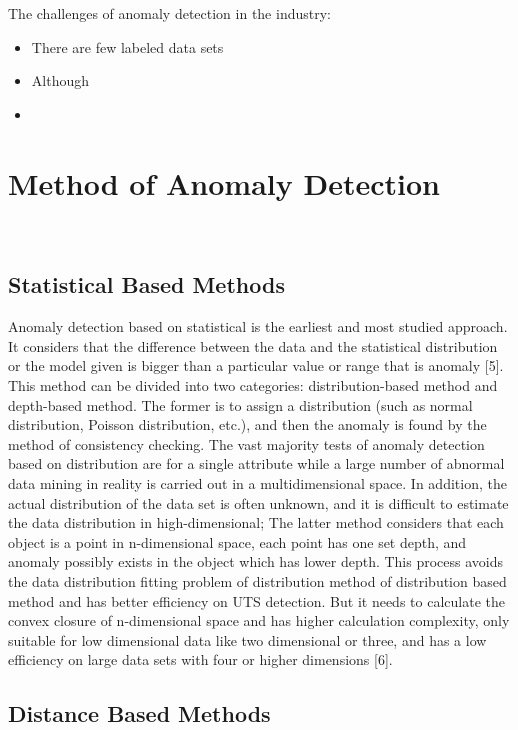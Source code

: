 The challenges of anomaly detection in the industry:
\begin{itemize}
    \item There are few labeled data sets 
    \item Although 
    \item 
\end{itemize}

\section{Method of Anomaly Detection}~\label{sec-method}
\subsection{Statistical Based Methods}
Anomaly detection based on statistical is the earliest and
most studied approach.
It considers that the difference
between the data and the statistical distribution or the model
given is bigger than a particular value or range that is
anomaly [5].
This method can be divided into two
categories: distribution-based method and depth-based
method.
The former is to assign a distribution (such as
normal distribution,
Poisson distribution,
etc.),
and then the anomaly is found by the method of consistency checking.
The vast majority tests of anomaly detection based on
distribution are for a single attribute while a large number
of abnormal data mining in reality is carried out in a
multidimensional space.
In addition,
the actual distribution
of the data set is often unknown,
and it is difficult to
estimate the data distribution in high-dimensional; The
latter method considers that each object is a point in
n-dimensional space,
each point has one set depth,
and anomaly possibly exists in the object which has lower depth.
This process avoids the data distribution fitting problem of
distribution method of distribution based method and has
better efficiency on UTS detection.
But it needs to calculate
the convex closure of n-dimensional space and has higher
calculation complexity,
only suitable for low dimensional
data like two dimensional or three,
and has a low efficiency
on large data sets with four or higher dimensions [6].

\subsection{Distance Based Methods}

